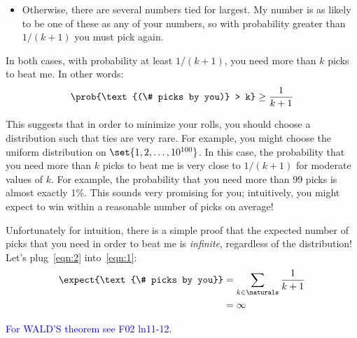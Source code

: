 \begin{editingnotes}
\begin{itemize}
\item Otherwise, there are several numbers tied for largest.  My
number is as likely to be one of these as any of your numbers, so with
probability greater than $1/(k+1)$ you must pick again.

\end{itemize}
%
In both cases, with probability at least $1/(k+1)$, you need more than
$k$ picks to beat me.  In other words:
%
\begin{align}
\prob{\text{(\# picks by you)} > k} \geq \frac{1}{k+1} \label{eqn:2}
\end{align}

This suggests that in order to minimize your rolls, you should choose a
distribution such that ties are very rare.  For example, you might
choose the uniform distribution on $\set{1, 2, \dots, 10^{100}}$.  In
this case, the probability that you need more than $k$ picks to beat
me is very close to $1/(k+1)$ for moderate values of $k$.  For
example, the probability that you need more than 99 picks is almost
exactly 1\%.  This sounds very promising for you; intuitively, you
might expect to win within a reasonable number of picks on average!

Unfortunately for intuition, there is a simple proof that the expected
number of picks that you need in order to beat me is
\emph{infinite}, regardless of the distribution!  Let's
plug~\eqref{eqn:2} into~\eqref{eqn:1}:
%
\begin{align*}
\expect{\text{\# picks by you}}
    & = \sum_{k \in \naturals} \frac{1}{k+1} \\
    & = \infty
\end{align*}

\end{editingnotes}

\begin{editingnotes}
\textcolor{blue}{For WALD'S theorem see F02 ln11-12.}
\end{editingnotes}

\begin{problems}
\practiceproblems
{}

\classproblems
{}

\homeworkproblems
{}

\homeworkproblems
{}
\end{problems}

\endinput
